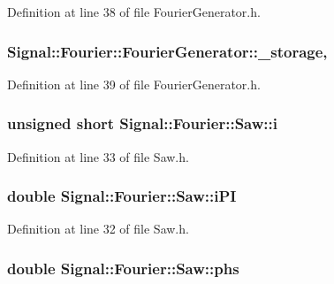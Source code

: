 Definition at line 38 of file Fourier\+Generator.\+h.

\hypertarget{classSignal_1_1Fourier_1_1FourierGenerator_ab6e6b79cf56e31c9a1b5766f357f8cfb}{
\subsubsection[{\+\_\+storage}]{ Signal\+::\+Fourier\+::\+Fourier\+Generator\+::\+\_\+storage\hspace{0.3cm}{\ttfamily [protected]}, {\ttfamily [inherited]}}}\label{classSignal_1_1Fourier_1_1FourierGenerator_ab6e6b79cf56e31c9a1b5766f357f8cfb}


Definition at line 39 of file Fourier\+Generator.\+h.

\hypertarget{classSignal_1_1Fourier_1_1Saw_a1e575a999b316e51cb3a4f8af962749c}{
\subsubsection[{i}]{\setlength{\rightskip}{0pt plus 5cm}unsigned short Signal\+::\+Fourier\+::\+Saw\+::i\hspace{0.3cm}{\ttfamily [protected]}}}\label{classSignal_1_1Fourier_1_1Saw_a1e575a999b316e51cb3a4f8af962749c}


Definition at line 33 of file Saw.\+h.

\hypertarget{classSignal_1_1Fourier_1_1Saw_a70dccb676ad58a1b6ef4b053081bec3f}{
\subsubsection[{i\+P\+I}]{\setlength{\rightskip}{0pt plus 5cm}double Signal\+::\+Fourier\+::\+Saw\+::i\+P\+I\hspace{0.3cm}{\ttfamily [protected]}}}\label{classSignal_1_1Fourier_1_1Saw_a70dccb676ad58a1b6ef4b053081bec3f}


Definition at line 32 of file Saw.\+h.

\hypertarget{classSignal_1_1Fourier_1_1Saw_a3c26ea58f2340c1d9a296937cec78a86}{
\subsubsection[{phs}]{\setlength{\rightskip}{0pt plus 5cm}double Signal\+::\+Fourier\+::\+Saw\+::phs\hspace{0.3cm}{\ttfamily [protected]}}}\label{classSignal_1_1Fourier_1_1Saw_a3c26ea58f2340c1d9a296937cec78a86}


